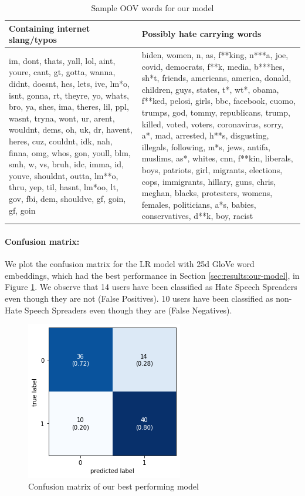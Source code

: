 \begin{table}[htbp]
\centering
\begin{tabular}{|p{6.8cm}|p{8.5cm}|}
\hline
\textbf{Containing internet slang/typos} & \textbf{Possibly hate carrying words} \\ \hline
im, dont, thats, yall, lol, aint, youre, cant, gt, gotta, wanna, didnt, doesnt, hes, lets, ive, lm*o, isnt, gonna, rt, theyre, yo, whats, bro, ya, shes, ima, theres, lil, ppl, wasnt, tryna, wont, ur, arent, wouldnt, dems, oh, uk, dr, havent, heres, cuz, couldnt, idk, nah, finna, omg, whos, gon, youll, blm, smh, w, vs, bruh, idc, imma, id, youve, shouldnt, outta, lm**o, thru, yep, til, hasnt, lm*oo, lt, gov, fbi, dem, shouldve, gf, goin, gf, goin & biden, women, n, as, f**king, n***a, joe, covid, democrats, f**k, media, b***hes, sh*t, friends, americans, america, donald, children, guys, states, t*, wt*, obama, f**ked, pelosi, girls, bbc, facebook, cuomo, trumps, god, tommy, republicans, trump, killed, voted, voters, coronavirus, sorry, a*, mad, arrested, h**s, disgusting, illegals, following, m*s, jews, antifa, muslims, as*, whites, cnn, f**kin, liberals, boys, patriots, girl, migrants, elections, cops, immigrants, hillary, guns, chris, meghan, blacks, protesters, womens, females, politicians, a*s, babies, conservatives, d**k, boy, racist  \\ \hline
\end{tabular}
\caption{Sample OOV words for our model}
\label{tab:err-ana:our_model:oov}
\end{table}

\paragraph{Confusion matrix:}
We plot the confusion matrix for the \ac{LR} model with 25d \ac{GloVe} word embeddings, which had the best performance in Section \ref{sec:results:our-model}, in Figure \ref{fig:err-ana:our_model:confusion}. We observe that 14 users have been classified as Hate Speech Spreaders even though they are not (False Positives). 10 users have been classified as non-Hate Speech Spreaders even though they are (False Negatives).

\begin{figure}[htbp]
    \centering
    \includegraphics{assets/img/confusion_our-model.png}
    \caption{Confusion matrix of our best performing model}
    \label{fig:err-ana:our_model:confusion}
\end{figure}



